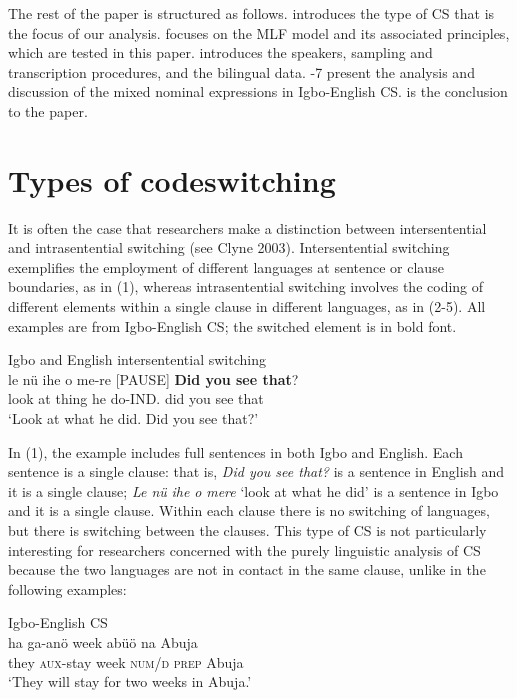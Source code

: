 \documentclass[output=paper]{langsci/langscibook}
\begin{document}
The rest of the paper is structured as follows.  introduces the type of CS that is the focus of our analysis.  focuses on the MLF model and its associated principles, which are tested in this paper.  introduces the speakers, sampling and transcription procedures, and the bilingual data. -7 present the analysis and discussion of the mixed nominal expressions in Igbo-English CS.  is the conclusion to the paper.  

\section{Types of codeswitching}

It is often the case that researchers make a distinction between intersentential and intrasentential switching (see Clyne 2003). Intersentential switching exemplifies the employment of different languages at sentence or clause boundaries, as in (1), whereas intrasentential switching involves the coding of different elements within a single clause in different languages, as in (2-5). All examples are from Igbo-English CS; the switched element is in bold font.

\ea
{Igbo and English intersentential switching\rmfnm{}}\\
\gll le    nü  ihe  o   me-re    [PAUSE] \textbf{Did you see that}?\\
     look  at  thing  he do-IND.                did  you see that\\
\glt ‘Look at what he did. Did you see that?’
\z
{}


In (1), the example includes full sentences in both Igbo and English. Each sentence is a single clause: that is, \textit{Did you see that? }is a sentence in English and it is a single clause; \textit{Le n}\textit{ü}\textit{ ihe o }\textit{mere} ‘look at what he did’ is a sentence in Igbo and it is a single clause. Within each clause there is no switching of languages, but there is switching between the clauses. This type of CS is not particularly interesting for researchers concerned with the purely linguistic analysis of CS because the two languages are not in contact in the same clause, unlike in the following examples:


\ea
{Igbo-English \textsc{CS}}\\
\gll ha    ga-anö     week  abüö  na  Abuja\\
     they  \textsc{aux}{}-stay  week  \textsc{num/d}  \textsc{prep} Abuja\\
\glt ‘They will stay for two weeks in Abuja.’
\z
\end{document}
